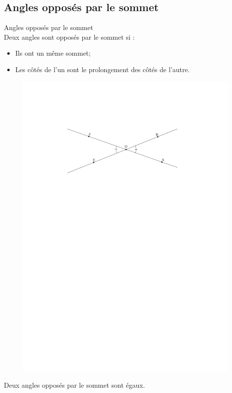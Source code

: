\documentclass[12pt]{article}
\begin{document}
\subsection*{Angles opposés par le sommet}
\begin{multicols}{2}
  \begin{Definition}{Angles opposés par le sommet}\\
    Deux angles sont opposés par le sommet si :
    \begin{itemize}
    \item Ils ont un même sommet;
    \item Les côtés de l'un sont le prolongement des côtés de l'autre.
    \end{itemize}
  \end{Definition}
  \begin{figure}[H]
    \centering
    \includegraphics[width=0.8\linewidth]{5x10-angles/sources/opposes.pdf}
  \end{figure}
\end{multicols}

\begin{Proposition}
  Deux angles opposés par le sommet sont égaux.
\end{Proposition}
\end{document}
